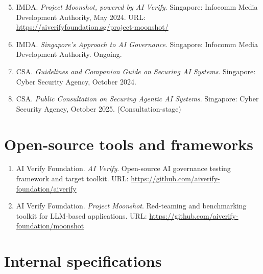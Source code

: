 \begin{enumerate}
  \setcounter{enumi}{4}
  \item IMDA. \textit{Project Moonshot, powered by AI Verify}.
        Singapore: Infocomm Media Development Authority, May 2024.
        URL: \url{https://aiverifyfoundation.sg/project-moonshot/}
  
  \item IMDA. \textit{Singapore's Approach to AI Governance}.
        Singapore: Infocomm Media Development Authority. Ongoing.
  
  \item CSA. \textit{Guidelines and Companion Guide on Securing AI Systems}.
        Singapore: Cyber Security Agency, October 2024.
  
  \item CSA. \textit{Public Consultation on Securing Agentic AI Systems}.
        Singapore: Cyber Security Agency, October 2025. (Consultation-stage)
\end{enumerate}

\section{Open-source tools and frameworks}

\begin{enumerate}
  \item AI Verify Foundation. \textit{AI Verify}. Open-source AI governance
        testing framework and target toolkit.
        URL: \url{https://github.com/aiverify-foundation/aiverify}
  
  \item AI Verify Foundation. \textit{Project Moonshot}. Red-teaming and
        benchmarking toolkit for LLM-based applications.
        URL: \url{https://github.com/aiverify-foundation/moonshot}
\end{enumerate}

\section{Internal specifications}

